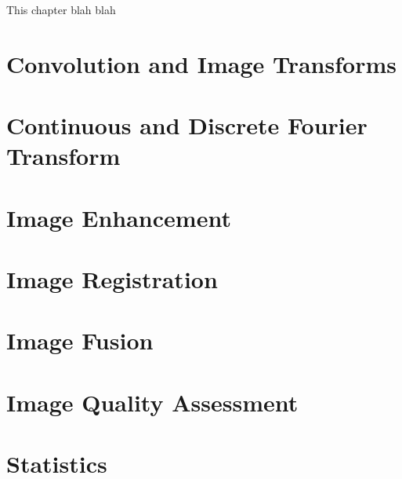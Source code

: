 

This chapter blah blah

\section{Convolution and Image Transforms}


\section{Continuous and Discrete Fourier Transform}


\section{Image Enhancement}


\section{Image Registration}


\section{Image Fusion}


\section{Image Quality Assessment}


\section{Statistics}
